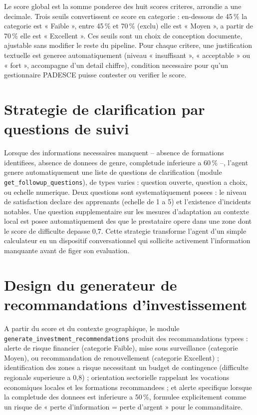 \documentclass[12pt,a4paper,twoside,openany]{report}
\begin{document}
Le score global est la somme ponderee des huit scores criteres, arrondie a une decimale. Trois seuils convertissent ce score en categorie : en-dessous de 45\,\% la categorie est « Faible », entre 45\,\% et 70\,\% (exclu) elle est « Moyen », a partir de 70\,\% elle est « Excellent ». Ces seuils sont un choix de conception documente, ajustable sans modifier le reste du pipeline. Pour chaque critere, une justification textuelle est generee automatiquement (niveau « insuffisant », « acceptable » ou « fort », accompagne d'un detail chiffre), condition necessaire pour qu'un gestionnaire PADESCE puisse contester ou verifier le score.

\section{Strategie de clarification par questions de suivi}

Lorsque des informations necessaires manquent -- absence de formations identifiees, absence de donnees de genre, completude inferieure a 60\,\% --, l'agent genere automatiquement une liste de questions de clarification (module \texttt{get\_followup\_questions}), de types varies : question ouverte, question a choix, ou echelle numerique. Deux questions sont systematiquement posees : le niveau de satisfaction declare des apprenants (echelle de 1 a 5) et l'existence d'incidents notables. Une question supplementaire sur les mesures d'adaptation au contexte local est posee automatiquement des que le prestataire opere dans une zone dont le score de difficulte depasse 0,7. Cette strategie transforme l'agent d'un simple calculateur en un dispositif conversationnel qui sollicite activement l'information manquante avant de figer son evaluation.

\section{Design du generateur de recommandations d'investissement}

A partir du score et du contexte geographique, le module \texttt{generate\_investment\_recommendations} produit des recommandations typees : alerte de risque financier (categorie Faible), mise sous surveillance (categorie Moyen), ou recommandation de renouvellement (categorie Excellent) ; identification des zones a risque necessitant un budget de contingence (difficulte regionale superieure a 0,8) ; orientation sectorielle rappelant les vocations economiques locales et les formations recommandees ; et alerte specifique lorsque la completude des donnees est inferieure a 50\,\%, formulee explicitement comme un risque de « perte d'information = perte d'argent » pour le commanditaire.
\end{document}
